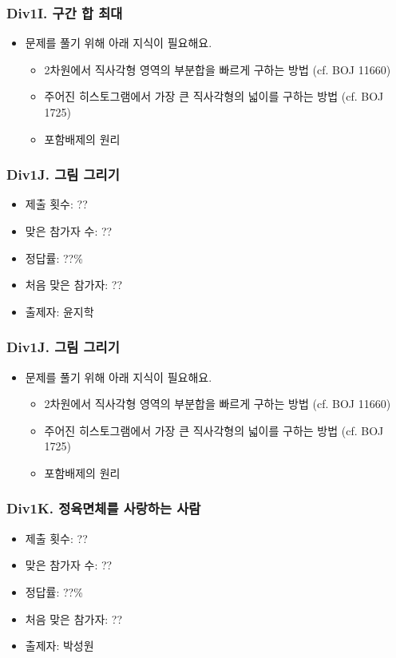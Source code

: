 \documentclass[xetex]{beamer}
\begin{document}
\begin{frame}
  \frametitle{Div1I. 구간 합 최대}
  \begin{itemize}
    \item 문제를 풀기 위해 아래 지식이 필요해요.
    \begin{itemize}
      \item 2차원에서 직사각형 영역의 부분합을 빠르게 구하는 방법 (cf. BOJ 11660)
      \item 주어진 히스토그램에서 가장 큰 직사각형의 넓이를 구하는 방법 (cf. BOJ 1725)
      \item 포함배제의 원리
    \end{itemize}
  \end{itemize}
\end{frame}

\begin{frame}
  \frametitle{Div1J. 그림 그리기}
  \begin{itemize}
    \item 제출 횟수: ??
    \item 맞은 참가자 수: ??
    \item 정답률: ??\%
    \item 처음 맞은 참가자: ??
    \item 출제자: 윤지학
  \end{itemize}
\end{frame}

\begin{frame}
  \frametitle{Div1J. 그림 그리기}
  \begin{itemize}
    \item 문제를 풀기 위해 아래 지식이 필요해요.
    \begin{itemize}
      \item 2차원에서 직사각형 영역의 부분합을 빠르게 구하는 방법 (cf. BOJ 11660)
      \item 주어진 히스토그램에서 가장 큰 직사각형의 넓이를 구하는 방법 (cf. BOJ 1725)
      \item 포함배제의 원리
    \end{itemize}
  \end{itemize}
\end{frame}

\begin{frame}
  \frametitle{Div1K. 정육면체를 사랑하는 사람}
  \begin{itemize}
    \item 제출 횟수: ??
    \item 맞은 참가자 수: ??
    \item 정답률: ??\%
    \item 처음 맞은 참가자: ??
    \item 출제자: 박성원
  \end{itemize}
\end{frame}
\end{document}
